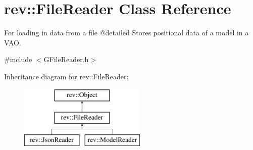 \hypertarget{classrev_1_1_file_reader}{}\section{rev\+::File\+Reader Class Reference}
\label{classrev_1_1_file_reader}


For loading in data from a file @detailed Stores positional data of a model in a V\+AO.  




{\ttfamily \#include $<$G\+File\+Reader.\+h$>$}

Inheritance diagram for rev\+::File\+Reader\+:\begin{figure}[H]
\begin{center}
\leavevmode
\includegraphics[height=3.000000cm]{classrev_1_1_file_reader}
\end{center}
\end{figure}
